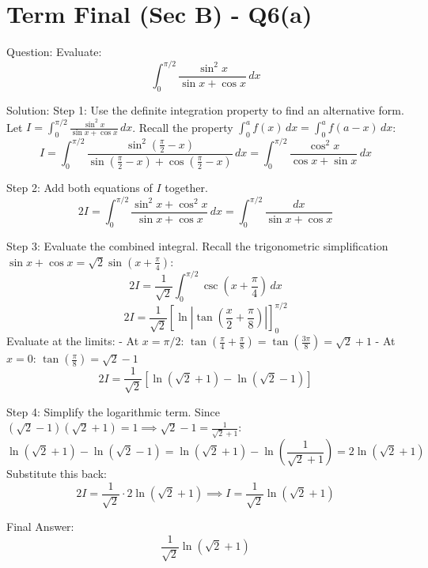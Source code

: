 \documentclass{article}
\begin{document}
\section*{Term Final (Sec B) - Q6(a)}
Question:
Evaluate:
\[
\int_0^{\pi/2} \frac{\sin^2 x}{\sin x + \cos x} \, dx
\]

Solution:
Step 1: Use the definite integration property to find an alternative form.
Let $I = \int_0^{\pi/2} \frac{\sin^2 x}{\sin x + \cos x} \, dx$.
Recall the property $\int_0^a f(x) \, dx = \int_0^a f(a-x) \, dx$:
\[
I = \int_0^{\pi/2} \frac{\sin^2\left(\frac{\pi}{2}-x\right)}{\sin\left(\frac{\pi}{2}-x\right) + \cos\left(\frac{\pi}{2}-x\right)} \, dx = \int_0^{\pi/2} \frac{\cos^2 x}{\cos x + \sin x} \, dx
\]

Step 2: Add both equations of $I$ together.
\[
2I = \int_0^{\pi/2} \frac{\sin^2 x + \cos^2 x}{\sin x + \cos x} \, dx = \int_0^{\pi/2} \frac{dx}{\sin x + \cos x}
\]

Step 3: Evaluate the combined integral.
Recall the trigonometric simplification $\sin x + \cos x = \sqrt{2} \sin\left(x + \frac{\pi}{4}\right)$:
\[
2I = \frac{1}{\sqrt{2}} \int_0^{\pi/2} \csc\left(x + \frac{\pi}{4}\right) \, dx
\]
\[
2I = \frac{1}{\sqrt{2}} \left[ \ln\left| \tan\left( \frac{x}{2} + \frac{\pi}{8} \right) \right| \right]_0^{\pi/2}
\]
Evaluate at the limits:
- At $x = \pi/2$: $\tan\left(\frac{\pi}{4} + \frac{\pi}{8}\right) = \tan\left(\frac{3\pi}{8}\right) = \sqrt{2} + 1$
- At $x = 0$: $\tan\left(\frac{\pi}{8}\right) = \sqrt{2} - 1$
\[
2I = \frac{1}{\sqrt{2}} \left[ \ln(\sqrt{2} + 1) - \ln(\sqrt{2} - 1) \right]
\]

Step 4: Simplify the logarithmic term.
Since $(\sqrt{2}-1)(\sqrt{2}+1) = 1 \implies \sqrt{2}-1 = \frac{1}{\sqrt{2}+1}$:
\[
\ln(\sqrt{2}+1) - \ln(\sqrt{2}-1) = \ln(\sqrt{2}+1) - \ln\left(\frac{1}{\sqrt{2}+1}\right) = 2\ln(\sqrt{2}+1)
\]
Substitute this back:
\[
2I = \frac{1}{\sqrt{2}} \cdot 2\ln(\sqrt{2} + 1) \implies I = \frac{1}{\sqrt{2}}\ln(\sqrt{2}+1)
\]

Final Answer:
\[
\boxed{\frac{1}{\sqrt{2}}\ln(\sqrt{2}+1)}
\]
\end{document}

